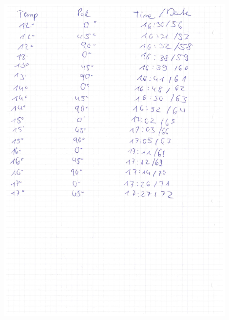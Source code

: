 \documentclass[12pt]{article}
\begin{document}
\begin{minipage}{\textwidth}
	\centering
	\includegraphics[width=0.9\textwidth]{laborbuch/laborbuch4.pdf}
\end{minipage}
\end{document}
